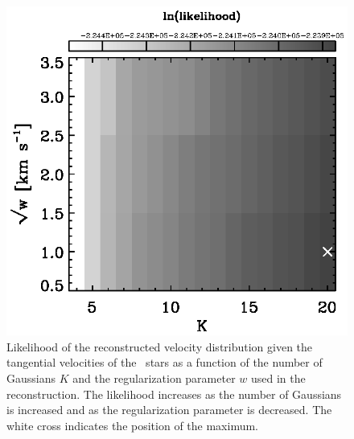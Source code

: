 \clearpage
\begin{figure}
\includegraphics{figs_veldist/loglike.ps}
\caption[Likelihood of the reconstructed velocity distribution given the tangential velocities of the \Hipparcos\ stars as a function of the number of Gaussians $K$ and the regularization parameter $w$ used in the reconstruction]{Likelihood of the reconstructed velocity distribution given the tangential velocities of the \Hipparcos\ stars as a function of the number of Gaussians $K$ and the regularization parameter $w$ used in the reconstruction. The likelihood increases as the number of Gaussians is increased and as the regularization parameter is decreased. The white cross indicates the position of the maximum.}%
\label{fig:loglike}
\end{figure}


